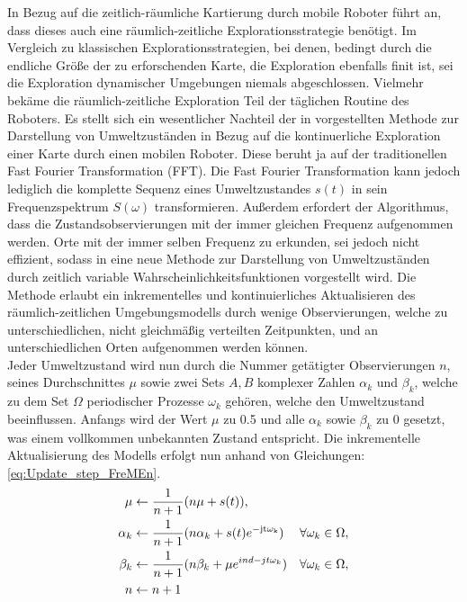 In Bezug auf die zeitlich-räumliche Kartierung durch mobile Roboter führt \cite{Krajnik.2015} an, dass dieses auch eine räumlich-zeitliche Explorationsstrategie benötigt. Im Vergleich zu klassischen Explorationsstrategien, bei denen, bedingt durch die endliche Größe der zu erforschenden Karte, die Exploration ebenfalls finit ist, sei die Exploration dynamischer Umgebungen niemals abgeschlossen. Vielmehr bekäme die räumlich-zeitliche Exploration Teil der täglichen Routine des Roboters.
Es stellt sich ein wesentlicher Nachteil der in \cite{Krajnik.2014} vorgestellten Methode zur Darstellung von Umweltzuständen in Bezug auf die kontinuerliche Exploration einer Karte durch einen mobilen Roboter. Diese beruht ja auf der traditionellen Fast Fourier Transformation (FFT). Die Fast Fourier Transformation kann jedoch lediglich die komplette Sequenz eines Umweltzustandes $s(t)$ in sein Frequenzspektrum $S(\omega)$ transformieren. Außerdem erfordert der Algorithmus, dass die Zustandsobservierungen mit der immer gleichen Frequenz aufgenommen werden.  Orte mit der immer selben Frequenz zu erkunden, sei jedoch nicht effizient, sodass in \cite{Krajnik.2015} eine neue Methode zur Darstellung von Umweltzuständen durch zeitlich variable Wahrscheinlichkeitsfunktionen vorgestellt wird. Die Methode erlaubt ein inkrementelles und kontinuierliches Aktualisieren des räumlich-zeitlichen Umgebungsmodells durch wenige Observierungen, welche zu unterschiedlichen, nicht gleichmäßig verteilten Zeitpunkten, und an unterschiedlichen Orten aufgenommen werden können. \\
Jeder Umweltzustand wird nun durch die Nummer getätigter Observierungen $n$, seines Durchschnittes $\mu$ sowie zwei Sets $A,B$ komplexer Zahlen $\alpha_k$ und $\beta_k$, welche zu dem Set $\Omega$ periodischer Prozesse $\omega_k$ gehören, welche den Umweltzustand beeinflussen. Anfangs wird der Wert $\mu$ zu 0.5 und alle $\alpha_k$ sowie $\beta_k$ zu 0 gesetzt, was einem vollkommen unbekannten Zustand entspricht. Die inkrementelle Aktualisierung des Modells erfolgt nun anhand von Gleichungen: \ref{eq:Update_step_FreMEn}.
\begin{align}
	\mu &\leftarrow \frac{1}{n+1}(n \mu + s(t)), \\
	\alpha_k &\leftarrow \frac{1}{n+1} (n \alpha_k + s(t) e^{\mathrm{-jt\omega_k}})  &\forall \omega_k \in \Omega, \\
	\beta_k &\leftarrow \frac{1}{n+1} (n \beta_k + \mu e^{ind{-jt\omega_k}})  &\forall \omega_k \in \Omega, \\
	n &\leftarrow n + 1
	\label{eq:Update_step_FreMEn}
\end{align}
